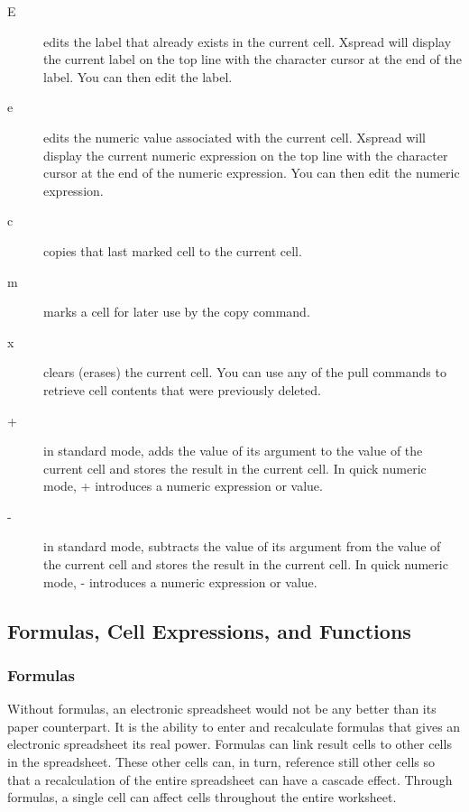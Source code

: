 \begin{description}
\item[E]{ edits the label that already exists in the current cell.  Xspread will 
display the current label on the top line with the character cursor at the end 
of the label.  You can then edit the label.}

\item[e]{ edits the numeric value associated with the current cell.  Xspread will 
display the current numeric expression on the top line with the character 
cursor at the end of the numeric expression.  You can then edit the numeric 
expression.}

\item[c]{ copies that last marked cell to the current cell.}

\item[m]{ marks a cell for later use by the copy command.}

\item[x]{ clears (erases) the current cell.  You can use any of the pull commands 
to retrieve cell contents that were previously deleted.}

\item[+]{ in standard mode, adds the value of its argument to the value of the 
current cell and stores the result in the current cell.  In quick numeric 
mode, + introduces a numeric expression or value.}

\item[-]{ in standard mode, subtracts the value of its argument from the value of 
the current cell and stores the result in the current cell.  In quick numeric 
mode, - introduces a numeric expression or value.}
\end{description}

\subsection*{Formulas, Cell Expressions, and Functions}

\subsubsection*{Formulas}

    Without formulas, an electronic spreadsheet would not be any better than 
its paper counterpart.  It is the ability to enter and recalculate formulas 
that gives an electronic spreadsheet its real power.  Formulas can link result 
cells to other cells in the spreadsheet.  These other cells can, in turn, 
reference still other cells so that a recalculation of the entire spreadsheet 
can have a cascade effect.  Through formulas, a single cell can affect cells 
throughout the entire worksheet.

